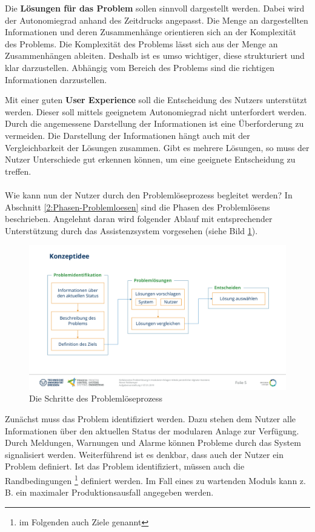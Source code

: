 Die \textbf{Lösungen für das Problem} sollen sinnvoll dargestellt werden. Dabei wird der Autonomiegrad anhand des Zeitdrucks angepasst. Die Menge an dargestellten Informationen und deren Zusammenhänge orientieren sich an der Komplexität des Problems. Die Komplexität des Problems lässt sich aus der Menge an Zusammenhängen ableiten. Deshalb ist es umso wichtiger, diese strukturiert und klar darzustellen. Abhängig vom Bereich des Problems sind die richtigen Informationen darzustellen.

Mit einer guten \textbf{User Experience} soll die Entscheidung des Nutzers unterstützt werden. Dieser soll mittels geeignetem Autonomiegrad nicht unterfordert werden. Durch die angemessene Darstellung der Informationen ist eine Überforderung zu vermeiden. Die Darstellung der Informationen hängt auch mit der Vergleichbarkeit der Lösungen zusammen. Gibt es mehrere Lösungen, so muss der Nutzer Unterschiede gut erkennen können, um eine geeignete Entscheidung zu treffen.
\\ \\
Wie kann nun der Nutzer durch den Problemlöseprozess begleitet werden? In Abschnitt \ref{2:Phasen-Problemloesen} sind die Phasen des Problemlösens beschrieben. Angelehnt daran wird folgender Ablauf mit entsprechender Unterstützung durch das Assistenzsystem vorgesehen (siehe Bild \ref{pic:Konzeptidee}).
\begin{figure}[htbp]
\centering
\includegraphics[scale=0.45]{DA_files/Bilder/Konzept/Konzeptidee.pdf}
\caption{Die Schritte des Problemlöseprozess}
\label{pic:Konzeptidee}
\end{figure}

Zunächst muss das Problem identifiziert werden. Dazu stehen dem Nutzer alle Informationen über den aktuellen Status der modularen Anlage zur Verfügung. Durch Meldungen, Warnungen und Alarme können Probleme durch das System signalisiert werden. Weiterführend ist es denkbar, dass auch der Nutzer ein Problem definiert. Ist das Problem identifiziert, müssen auch die Randbedingungen \footnote{im Folgenden auch Ziele genannt} definiert werden. Im Fall eines zu wartenden Moduls kann z. B. ein maximaler Produktionsausfall angegeben werden.

